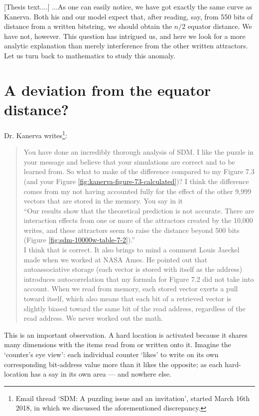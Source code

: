 \documentclass[12pt]{article}
\begin{document}
[Thesis text....] ...As one can easily notice, we have got exactly the same curve as Kanerva. Both his and our model expect that, after reading, say, from 550 bits of distance from a written bitstring, we should obtain the $n/2$ equator distance. We have not, however.  This question has intrigued us, and here we look for a more analytic explanation than merely interference from the other written attractors. Let us turn back to mathematics to study this anomaly.

\section{A deviation from the equator distance?}

Dr. Kanerva writes\footnote{Email thread `SDM: A puzzling issue and an invitation', started March 16th 2018, in which we discussed the aforementioned discrepancy.}:

\begin{quote}
    You have done an incredibly thorough analysis of SDM. I like the puzzle in your message and believe that your simulations are correct and to be learned from.  So what to make of the difference compared to my Figure 7.3 (and your Figure \ref{fig:kanerva-figure-73-calculated})?  I think the difference comes from my not having accounted fully for the effect of the other 9,999 vectors that are stored in the memory.  You say in it\\

   ``Our results show that the theoretical prediction is not accurate. There are interaction effects from one or more of the attractors created by the 10,000 writes, and these attractors seem to raise the distance beyond 500 bits (Figure \ref{fig:sdm-10000w-table-7-2}).'' \\

   I think that is correct.  It also brings to mind a comment Louis Jaeckel made when we worked at NASA Ames.  He pointed out that autoassociative storage (each vector is stored with itself as the address) introduces autocorrelation that my formula for Figure 7.2 did not take into account.  When we read from memory, each stored vector exerts a pull toward itself, which also means that each bit of a retrieved vector is slightly biased toward the same bit of the read address, regardless of the read address.  We never worked out the math.
\end{quote}

This is an important observation. A hard location is activated because it shares many dimensions with the items read from or written onto it. Imagine the `counter's eye view':  each individual counter `likes' to write on its own corresponding bit-address value more than it likes the opposite; as each hard-location has a say in its own area --- and nowhere else.
\end{document}
